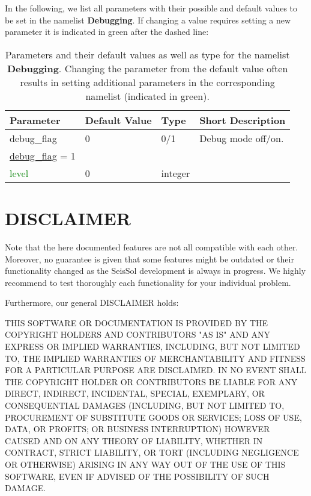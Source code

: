 \documentclass[12pt,twoside]{article}
\begin{document}
In the following, we list all parameters with their possible and default values to be set in the namelist \textbf{Debugging}.
If changing a value requires setting a new
parameter it is indicated in green after the dashed line:\\

\begin{table}[H]
\caption{Parameters and their default values as well as type for the namelist \textbf{Debugging}.
         Changing the parameter from the default value often results in setting additional parameters
         in the corresponding namelist (indicated in green).}
\begin{center}
\begin{tabular}{|p{4cm}|p{2.7cm}|p{2cm}|p{4cm}|}
\hline
Parameter & Default Value & Type & Short Description \\
\hline
\hline
debug\_flag & 0 & 0/1 & Debug mode off/on. \\
\hdashline
\uline{debug\_flag} = 1 & & & \\
\textcolor{green}{level} & 0 & integer & \\
\hline
\end{tabular}
\end{center}
\label{debug-table}
\end{table}

\newpage

\section{DISCLAIMER}

Note that the here documented features are not all compatible with each other.
Moreover, no guarantee is given that some features might be outdated or their functionality changed
as the SeisSol development is always in progress.
We highly recommend to test thoroughly each functionality for your individual problem.

\noindent Furthermore, our general DISCLAIMER holds:

\noindent THIS SOFTWARE OR DOCUMENTATION IS PROVIDED BY THE COPYRIGHT HOLDERS AND CONTRIBUTORS "AS IS"
AND ANY EXPRESS OR IMPLIED WARRANTIES, INCLUDING, BUT NOT LIMITED TO, THE
IMPLIED WARRANTIES OF MERCHANTABILITY AND FITNESS FOR A PARTICULAR PURPOSE
ARE DISCLAIMED. IN NO EVENT SHALL THE COPYRIGHT HOLDER OR CONTRIBUTORS BE
LIABLE FOR ANY DIRECT, INDIRECT, INCIDENTAL, SPECIAL, EXEMPLARY, OR
CONSEQUENTIAL DAMAGES (INCLUDING, BUT NOT LIMITED TO, PROCUREMENT OF
SUBSTITUTE GOODS OR SERVICES; LOSS OF USE, DATA, OR PROFITS; OR BUSINESS
INTERRUPTION) HOWEVER CAUSED AND ON ANY THEORY OF LIABILITY, WHETHER IN
CONTRACT, STRICT LIABILITY, OR TORT (INCLUDING NEGLIGENCE OR OTHERWISE)
ARISING IN ANY WAY OUT OF THE USE OF THIS SOFTWARE, EVEN IF ADVISED OF THE
POSSIBILITY OF SUCH DAMAGE.
\end{document}
